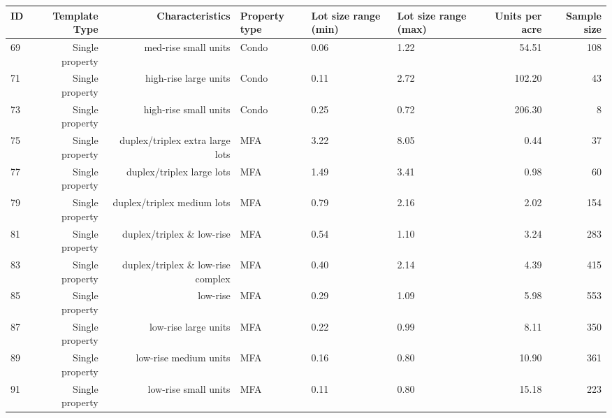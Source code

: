 \begin{tabular}{ p{0.5in} r r p{1in} p{0.75in} p{0.75in} rr}

ID & Template Type & Characteristics & Property type & Lot size range (min) & Lot size range (max) & Units per acre & Sample size \\
\hline
        69 & Single property & med-rise small units & Condo &       0.06 &       1.22 &      54.51 &        108 \\

        71 & Single property & high-rise large units & Condo &       0.11 &       2.72 &     102.20 &         43 \\

        73 & Single property & high-rise small units & Condo &       0.25 &       0.72 &     206.30 &          8 \\

        75 & Single property & duplex/triplex extra large lots & MFA &       3.22 &       8.05 &       0.44 &         37 \\

        77 & Single property & duplex/triplex large lots & MFA &       1.49 &       3.41 &       0.98 &         60 \\

        79 & Single property & duplex/triplex medium lots & MFA &       0.79 &       2.16 &       2.02 &        154 \\

        81 & Single property & duplex/triplex \& low-rise & MFA &       0.54 &       1.10 &       3.24 &        283 \\

        83 & Single property & duplex/triplex \& low-rise complex & MFA &       0.40 &       2.14 &       4.39 &        415 \\

        85 & Single property &   low-rise & MFA &       0.29 &       1.09 &       5.98 &        553 \\

        87 & Single property & low-rise large units & MFA &       0.22 &       0.99 &       8.11 &        350 \\

        89 & Single property & low-rise medium units & MFA &       0.16 &       0.80 &      10.90 &        361 \\

        91 & Single property & low-rise small units & MFA &       0.11 &       0.80 &      15.18 &        223 \\


\end{tabular}
